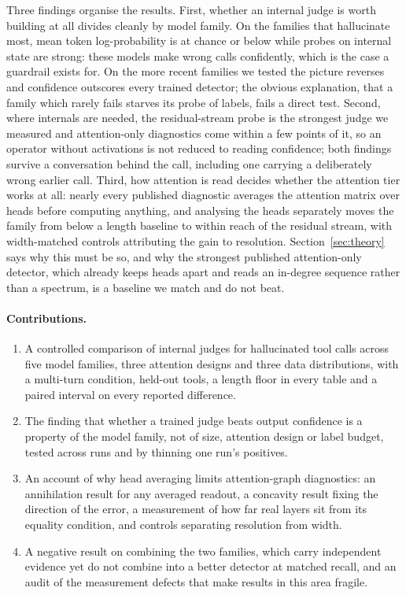 Three findings organise the results. First, whether an internal judge is worth building at all divides
cleanly by model family. On the families that hallucinate most, mean token log-probability is at chance or
below while probes on internal state are strong: these models make wrong calls confidently, which is the case
a guardrail exists for. On the more recent families we tested the picture reverses and confidence outscores
every trained detector; the obvious explanation, that a family which rarely fails starves its probe of
labels, fails a direct test. Second, where internals are needed, the residual-stream probe is the strongest
judge we measured and attention-only diagnostics come within a few points of it, so an operator without
activations is not reduced to reading confidence; both findings survive a conversation behind the call,
including one carrying a deliberately wrong earlier call. Third, how attention is read decides whether the
attention tier works at all: nearly every published diagnostic averages the attention matrix over heads
before computing anything, and analysing the heads separately moves the family from below a length baseline
to within reach of the residual stream, with width-matched controls attributing the gain to resolution.
Section~\ref{sec:theory} says why this must be so, and why the strongest published attention-only detector,
which already keeps heads apart and reads an in-degree sequence rather than a spectrum, is a baseline we
match and do not beat.

\paragraph{Contributions.}
\begin{enumerate}[topsep=2pt,itemsep=1pt,leftmargin=1.4em]
\item A controlled comparison of internal judges for hallucinated tool calls across five model families,
three attention designs and three data distributions, with a multi-turn condition, held-out tools, a length
floor in every table and a paired interval on every reported difference.
\item The finding that whether a trained judge beats output confidence is a property of the model family,
not of size, attention design or label budget, tested across runs and by thinning one run's positives.
\item An account of why head averaging limits attention-graph diagnostics: an annihilation result for any
averaged readout, a concavity result fixing the direction of the error, a measurement of how far real layers
sit from its equality condition, and controls separating resolution from width.
\item A negative result on combining the two families, which carry independent evidence yet do not combine
into a better detector at matched recall, and an audit of the measurement defects that make results in this
area fragile.
\end{enumerate}
